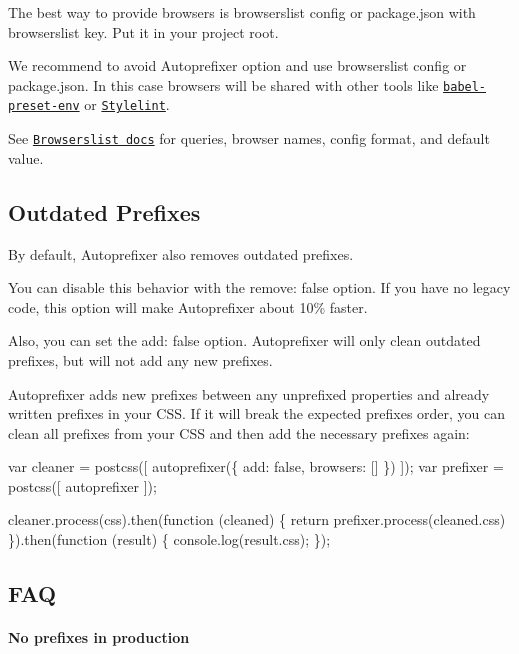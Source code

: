 The best way to provide browsers is {\ttfamily browserslist} config or {\ttfamily package.\+json} with {\ttfamily browserslist} key. Put it in your project root.

We recommend to avoid Autoprefixer option and use {\ttfamily browserslist} config or {\ttfamily package.\+json}. In this case browsers will be shared with other tools like \href{https://github.com/babel/babel-preset-env}{\tt babel-\/preset-\/env} or \href{http://stylelint.io/}{\tt Stylelint}.

See \href{https://github.com/ai/browserslist#queries}{\tt Browserslist docs} for queries, browser names, config format, and default value.

\subsection*{Outdated Prefixes}

By default, Autoprefixer also removes outdated prefixes.

You can disable this behavior with the {\ttfamily remove\+: false} option. If you have no legacy code, this option will make Autoprefixer about 10\% faster.

Also, you can set the {\ttfamily add\+: false} option. Autoprefixer will only clean outdated prefixes, but will not add any new prefixes.

Autoprefixer adds new prefixes between any unprefixed properties and already written prefixes in your C\+SS. If it will break the expected prefixes order, you can clean all prefixes from your C\+SS and then add the necessary prefixes again\+:


\begin{DoxyCode}
var cleaner  = postcss([ autoprefixer(\{ add: false, browsers: [] \}) ]);
var prefixer = postcss([ autoprefixer ]);

cleaner.process(css).then(function (cleaned) \{
    return prefixer.process(cleaned.css)
\}).then(function (result) \{
    console.log(result.css);
\});
\end{DoxyCode}


\subsection*{F\+AQ}

\paragraph*{No prefixes in production}

